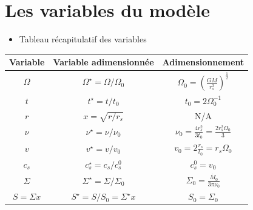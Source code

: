 \documentclass[french]{beamer}
\begin{document}
\section{Les variables du modèle}
\begin{frame}
\begin{itemize}
	\item {Tableau récapitulatif des variables}
\end{itemize}

\begin{center}
    \begin{tabular}{|c|c|c|}
        \hline
        Variable & Variable adimensionnée & Adimensionnement \\
        \hline
        $\Omega$ & $\Omega^\star = \Omega/\Omega_0$ & $\Omega_0 = \left( \frac{G M}{r^3_s} \right)^\frac{1}{2}$ \\
        $t$ & $t^\star = t/t_0$ & $t_0 = 2 \Omega_0^{-1}$ \\
        $r$ & $x = \sqrt{r/r_s}$ & N/A \\
        $\nu$ & $\nu^\star = \nu/\nu_0$ & $\nu_0 = \frac{4 r_s^2}{3 t_0} = \frac{2 r_s^2 \Omega_0}{3}$ \\
        $v$ & $v^\star = v/v_0$ & $v_0 = 2 \frac{r_s}{t_0} = r_s \Omega_0$ \\
        $c_s$ & $c_s^\star = c_s/c_s^0$ & $c_s^0 = v_0$ \\
        $\Sigma$ & $\Sigma^\star = \Sigma/\Sigma_0$ & $\Sigma_0 = \frac{\dot{M_0}}{3 \pi \nu_0}$ \\
        $S = \Sigma x$ & $S^\star = S/S_0 = \Sigma^\star x$ & $S_0 = \Sigma_0$ \\
        \hline
    \end{tabular}
\end{center}

\end{frame}
\end{document}
